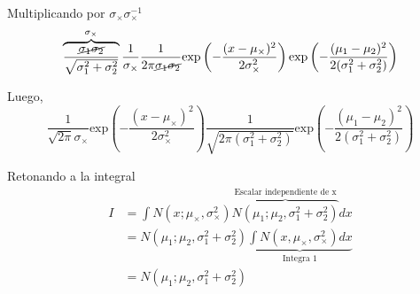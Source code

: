 \documentclass[a4paper,10pt]{article}
\begin{document}
Multiplicando por $\sigma_{\times}\sigma_{\times}^{-1}$
\begin{equation}
\overbrace{\frac{\cancel{\sigma_1\sigma_2}}{\sqrt{\sigma_1^2+\sigma_2^2}}}^{\sigma_{\times}} \frac{1}{\sigma_{\times}} \frac{1}{2\pi\cancel{\sigma_1\sigma_2}}\text{exp}\left(  - \frac{(x-\mu_{\times})^2}{2\sigma_{\times}^2} \right) \text{exp} \left( - \frac{(\mu_1 - \mu_2)^2}{2(\sigma_1^2 + \sigma_2^2)} \right)
\end{equation}

Luego,
\begin{equation}
 \frac{1}{\sqrt{2\pi}\sigma_{\times}}\text{exp}\left(  - \frac{(x-\mu_{\times})^2}{2\sigma_{\times}^2} \right) \frac{1}{\sqrt{2\pi(\sigma_1^2+\sigma_2^2)}} \text{exp} \left( - \frac{(\mu_1 - \mu_2)^2}{2(\sigma_1^2 + \sigma_2^2)} \right)
\end{equation}

Retonando a la integral
\begin{equation}
\begin{split}
I & = \int N(x;\mu_{\times},\sigma_{\times}^2) \overbrace{N(\mu_1;\mu_2,\sigma_1^2 + \sigma_2^2)}^{\text{Escalar independiente de x}} dx \\[0.3cm]
& = N(\mu_1;\mu_2,\sigma_1^2 + \sigma_2^2) \underbrace{\int N(x,\mu_{\times},\sigma_{\times}^2)  dx}_{\text{Integra 1}} \\
& = N(\mu_1;\mu_2,\sigma_1^2 + \sigma_2^2)
\end{split}
\end{equation}
\end{document}
